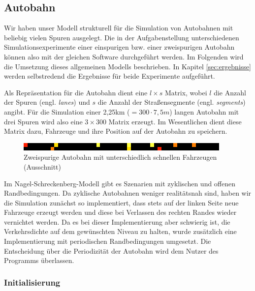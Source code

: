 \documentclass[10pt, a4paper]{article}
\newcommand\nsm{Nagel-Schreckenberg-Modell }
\begin{document}
\subsection{Autobahn}
\label{subsec:umsetzung-autobahn}

Wir haben unser Modell strukturell für die Simulation von Autobahnen mit beliebig vielen Spuren ausgelegt. Die in der Aufgabenstellung unterschiedenen Simulationsexperimente einer einspurigen bzw. einer zweispurigen Autobahn können also mit der gleichen Software durchgeführt werden. Im Folgenden wird die Umsetzung dieses allgemeinen Modells beschrieben. In Kapitel \ref{sec:ergebnisse} werden selbstredend die Ergebnisse für beide Experimente aufgeführt.

Als Repräsentation für die Autobahn dient eine $l \times s$ Matrix, wobei $l$ die Anzahl der Spuren (engl. \emph{lanes}) und $s$ die Anzahl der Straßensegmente (engl. \emph{segments}) angibt. Für die Simulation einer 2,25km ($= 300 \cdot 7,5m$) langen Autobahn mit drei Spuren wird also eine $3 \times 300$ Matrix erzeugt. Im Wesentlichen dient diese Matrix dazu, Fahrzeuge und ihre Position auf der Autobahn zu speichern.\\

\begin{figure}[h!]
	\centering
	\includegraphics{img/twoLaneRoad}
	\caption{Zweispurige Autobahn mit unterschiedlich schnellen Fahrzeugen (Ausschnitt)}
	\label{fig:twoLaneRoad}
\end{figure}

Im \nsm gibt es Szenarien mit zyklischen und offenen Randbedingungen. Da zyklische Autobahnen weniger realitätsnah sind, haben wir die Simulation zunächst so implementiert, dass stets auf der linken Seite neue Fahrzeuge erzeugt werden und diese bei Verlassen des rechten Randes wieder vernichtet werden. Da es bei dieser Implementierung aber schwierig ist, die Verkehrsdichte auf dem gewünschten Niveau zu halten, wurde zusätzlich eine Implementierung mit periodischen Randbedingungen umgesetzt. Die Entscheidung über die Periodizität der Autobahn wird dem Nutzer des Programms überlassen.

\subsubsection{Initialisierung}
\label{subsubsec:initialisierung}
\end{document}

